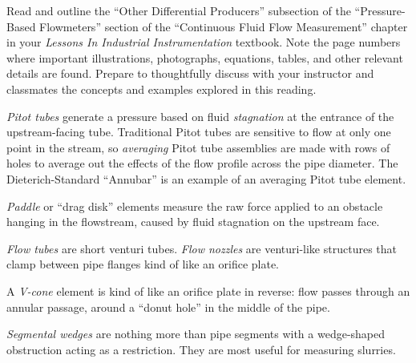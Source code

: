 

Read and outline the ``Other Differential Producers'' subsection of the ``Pressure-Based Flowmeters'' section of the ``Continuous Fluid Flow Measurement'' chapter in your {\it Lessons In Industrial Instrumentation} textbook.  Note the page numbers where important illustrations, photographs, equations, tables, and other relevant details are found.  Prepare to thoughtfully discuss with your instructor and classmates the concepts and examples explored in this reading.














{\it Pitot tubes} generate a pressure based on fluid {\it stagnation} at the entrance of the upstream-facing tube.  Traditional Pitot tubes are sensitive to flow at only one point in the stream, so {\it averaging} Pitot tube assemblies are made with rows of holes to average out the effects of the flow profile across the pipe diameter.  The Dieterich-Standard ``Annubar'' is an example of an averaging Pitot tube element.

\vskip 10pt

{\it Paddle} or ``drag disk'' elements measure the raw force applied to an obstacle hanging in the flowstream, caused by fluid stagnation on the upstream face.

\vskip 10pt

{\it Flow tubes} are short venturi tubes.  {\it Flow nozzles} are venturi-like structures that clamp between pipe flanges kind of like an orifice plate.

\vskip 10pt

A {\it V-cone} element is kind of like an orifice plate in reverse: flow passes through an annular passage, around a ``donut hole'' in the middle of the pipe.

\vskip 10pt

{\it Segmental wedges} are nothing more than pipe segments with a wedge-shaped obstruction acting as a restriction.  They are most useful for measuring slurries.

